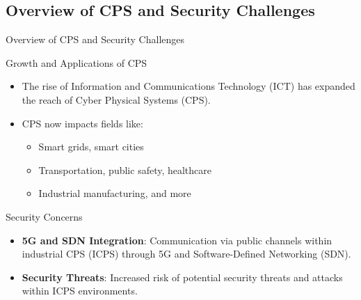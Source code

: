 \documentclass[9pt,handout]{beamer}
\begin{document}
\subsection{Overview of CPS and Security Challenges}
\begin{frame}{Overview of CPS and Security Challenges}

\begin{block}{Growth and Applications of CPS}
    \begin{itemize}
        \item The rise of Information and Communications Technology (ICT) has expanded the reach of Cyber Physical Systems (CPS).
        \item CPS now impacts fields like:
            \begin{itemize}
                \item Smart grids, smart cities
                \item Transportation, public safety, healthcare
                \item Industrial manufacturing, and more
            \end{itemize}
    \end{itemize}
\end{block}

\begin{block}{Security Concerns}
    \begin{itemize}
        \item \textbf{5G and SDN Integration}: Communication via public channels within industrial CPS (ICPS) through 5G and Software-Defined Networking (SDN).
        \item \textbf{Security Threats}: Increased risk of potential security threats and attacks within ICPS environments.
    \end{itemize}
\end{block}

\end{frame}

\end{document}
